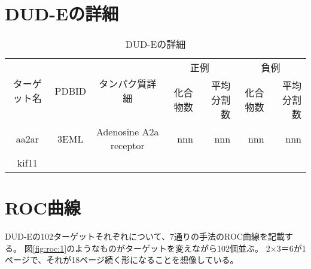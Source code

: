 \appendix
\chapter{DUD-Eの詳細}\label{appendix:dude}
\begin{table}[htb] \centering
	\caption{DUD-Eの詳細}
	\label{tb:dude_description}
	\begin{tabular}{c|c|c|rr|rr|}
	\multirow{2}{*}{ターゲット名}	&\multirow{2}{*}{PDBID}	&\multirow{2}{*}{タンパク質詳細}	&\multicolumn{2}{c|}{正例}	&\multicolumn{2}{c|}{負例}	\\
							&					&							&化合物数	&平均分割数	&化合物数	&平均分割数	\\ \hline
	aa2ar					&3EML				&Adenosine A2a receptor		&nnn		&nnn		&nnn		&nnn		\\
	kif11						&					&							&			&			&			&			\\ \hline
	\end{tabular}
\end{table}

\chapter{ROC曲線}\label{appendix:roc}
DUD-Eの102ターゲットそれぞれについて、7通りの手法のROC曲線を記載する。
図\ref{fig:roc:1}のようなものがターゲットを変えながら102個並ぶ。
2×3＝6が1ページで、それが18ページ続く形になることを想像している。

